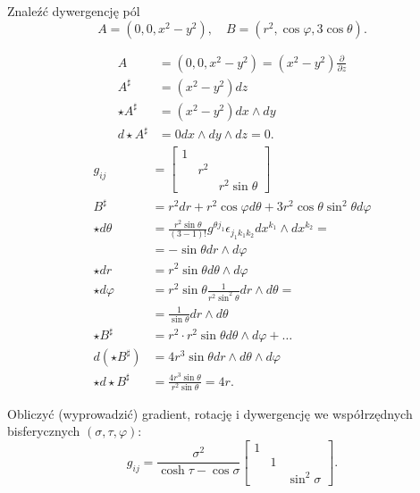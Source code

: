 \documentclass[../main.tex]{subfiles}
\begin{document}
\begin{cw}
    Znaleźć dywergencję pól
    \[
        A = (0,0,x^2-y^2),\quad B = (r^2, \cos\varphi, 3\cos\theta)
    .\]
\end{cw}
\begin{align*}
    A &= (0,0,x^2-y^2) = (x^2 - y^2) \frac{\partial }{\partial z}\\
    A^\sharp &= (x^2 - y^2) dz \\
    \star A^\sharp &= (x^2 - y^2) dx\land dy \\
    d \star A^\sharp &= 0 dx\land dy\land dz = 0
.\end{align*}
\begin{align*}
    g_{ij} &= \begin{bmatrix} 1&&\\&r^2&\\&&r^2\sin\theta \end{bmatrix}\\
    B^\sharp &= r^2 dr + r^2 \cos \varphi d\theta + 3 r^2 \cos\theta \sin^2\theta d\varphi\\
    \star d\theta &= \frac{r^2\sin\theta}{(3-1)!}g^{\theta j_1}\epsilon_{j_1k_1k_2}dx^{k_1}\land dx^{k_2} = \\
    &= -\sin\theta dr\land d\varphi \\
    \star dr &= r^2\sin\theta d\theta\land d\varphi\\
    \star d\varphi &= r^2\sin\theta \frac{1}{r^2\sin^2\theta} dr\land d\theta =\\
    &= \frac{1}{\sin\theta} dr\land d\theta \\
    \star B^\sharp &= r^2\cdot r^2\sin\theta d\theta \land d\varphi + \ldots\\
    d(\star B^\sharp) &= 4r^3\sin\theta dr\land d\theta \land d\varphi\\
    \star d \star B^\sharp &= \frac{4r^3\sin\theta}{r^2\sin\theta} = 4r
.\end{align*}
\begin{cw}
    Obliczyć (wyprowadzić) gradient, rotację i dywergencję we współrzędnych bisferycznych $(\sigma, \tau, \varphi)$:
\[
    g_{ij} = \frac{\sigma^2}{\cosh \tau - \cos \sigma} \begin{bmatrix} 1&&\\&1&\\&&\sin^2\sigma \end{bmatrix}
.\]
\end{cw}
\end{document}
